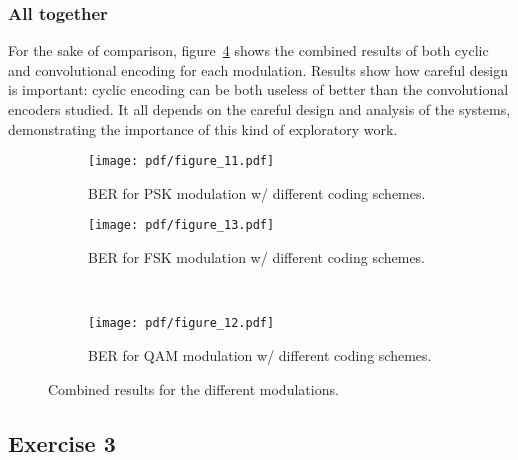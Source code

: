 \subsubsection{All together}

For the sake of comparison, figure~\ref{fig:rescomb} shows the combined results of
both cyclic and convolutional encoding for each modulation. Results show how
careful design is important: cyclic encoding can be both useless of better than
the convolutional encoders studied. It all depends on the careful design and
analysis of the systems, demonstrating the importance of this kind of exploratory
work.

\begin{figure}
    \centering
    \begin{subfigure}[t]{0.48\columnwidth}
        \centering
        \texttt{[image: pdf/figure\_11.pdf]}
        \caption{BER for PSK modulation w/ different coding schemes.
            \label{fig:pskcomb}}
    \end{subfigure} \hfill
    \begin{subfigure}[t]{0.48\columnwidth}
        \centering
        \texttt{[image: pdf/figure\_13.pdf]}
        \caption{BER for FSK modulation w/ different coding schemes.
            \label{fig:fskcomb}}
    \end{subfigure} \\
    \begin{subfigure}[t]{\columnwidth}
        \centering
        \texttt{[image: pdf/figure\_12.pdf]}
        \caption{BER for QAM modulation w/ different coding schemes.
            \label{fig:qamcomb}}
    \end{subfigure}
    \caption{Combined results for the different modulations.
        \label{fig:rescomb}}
\end{figure}

\subsection{Exercise 3}

